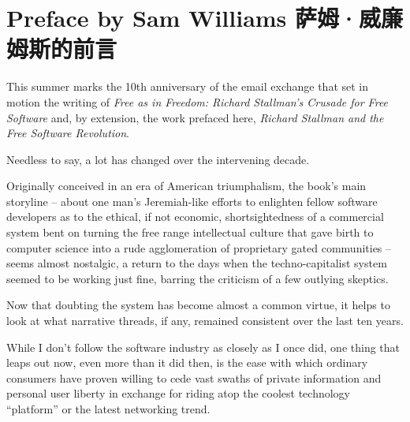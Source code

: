\chapter{\ifdefined\eng
Preface by Sam Williams
\fi
\ifdefined\chs
萨姆·威廉姆斯的前言
\fi
}

\ifdefined\eng
This summer marks the 10th anniversary of the email exchange that set
in motion the writing of \textit{Free as in Freedom: Richard
  Stallman's Crusade for Free Software} and, by extension, the work
prefaced here, \textit{Richard Stallman and the Free Software
  Revolution}.
\fi

\ifdefined\chs

\fi

\ifdefined\eng
Needless to say, a lot has changed over the intervening decade.
\fi

\ifdefined\chs

\fi

\ifdefined\eng
Originally conceived in an era of American triumphalism, the book's
main storyline -- about one man's Jeremiah-like efforts to enlighten
fellow software developers as to the ethical, if not economic,
shortsightedness of a commercial system bent on turning the free range
intellectual culture that gave birth to computer science into a rude
agglomeration of proprietary gated communities -- seems almost
nostalgic, a return to the days when the techno-capitalist system
seemed to be working just fine, barring the criticism of a few
outlying skeptics.
\fi

\ifdefined\chs

\fi

\ifdefined\eng
Now that doubting the system has become almost a common virtue, it  
helps to look at what narrative threads, if any, remained consistent  
over the last ten years.
\fi

\ifdefined\chs

\fi

\ifdefined\eng
While I don't follow the software industry as closely as I once did,  
one thing that leaps out now, even more than it did then, is the ease  
with which ordinary consumers have proven willing to cede vast swaths  
of private information and personal user liberty in exchange for  
riding atop the coolest technology ``platform'' or the latest networking  
trend.
\fi

